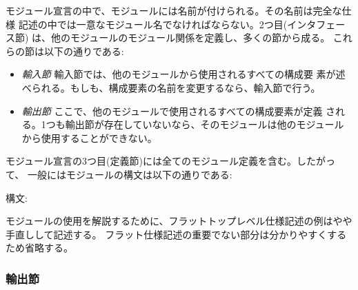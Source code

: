 \documentclass[\pformat,12pt]{jarticle}
\begin{document}
モジュール宣言の中で、モジュールには名前が付けられる。その名前は完全な仕様
記述の中では一意なモジュール名でなければならない。2つ目(インタフェー
ス節) は、他のモジュールのモジュール関係を定義し、多くの節から成る。
これらの節は以下の通りである:

\begin{itemize}
\item {\it 輸入節} 輸入節では、他のモジュールから使用されるすべての構成要
素が述べられる。もしも、構成要素の名前を変更するなら、輸入節で行う。

\item {\it 輸出節} ここで、他のモジュールで使用されるすべての構成要素が定義
される。1つも輸出節が存在していないなら、そのモジュールは他のモジュールから使用することができない。

\end{itemize}
モジュール宣言の3つ目(定義節)には全てのモジュール定義を含む。したがって、
一般にはモジュールの構文は以下の通りである:

\begin{description}
\item[構文:]

\end{description}

モジュールの使用を解説するために、フラットトップレベル仕様記述の例はやや手直しして記述する。
フラット仕様記述の重要でない部分は分かりやすくするため省略する。

\subsubsection{輸出節}
\end{document}
